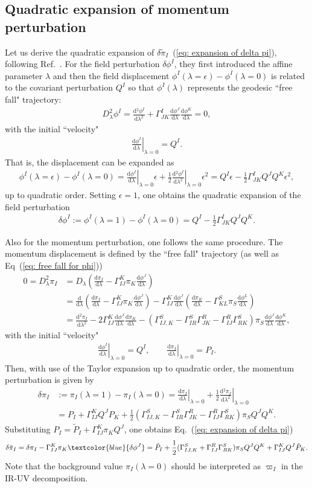 \documentclass[aps, prd
, preprint
, nofootinbib 
, longbibliography
]{revtex4-1}
\newcommand{\dif}[2]{\frac{\mathrm{d} #1}{\mathrm{d} #2}}
\newcommand{\bae}[1]{\begin{align} #1 \end{align}}
\newcommand{\mathblue}[1]{\textcolor{blue}{#1}}
\begin{document}
\subsection{Quadratic expansion of momentum perturbation}

Let us derive the quadratic expansion of $\delta\tilde{\pi}_I$~(\ref{eq: expansion of delta pi}), following Ref.~\cite{Gong:2011uw}.
For the field perturbation $\delta\phi^I$, they first introduced the affine parameter $\lambda$ and then the field displacement $\phi^I(\lambda=\epsilon)-\phi^I(\lambda=0)$ is related to the covariant perturbation $Q^I$ so that $\phi^I(\lambda)$ represents the geodesic ``free fall" trajectory:
\bae{\label{eq: free fall for phi}
    D_\lambda^2\phi^I=\dif{{}^2\phi^I}{\lambda^2}+\Gamma^I_{JK}\dif{\phi^J}{\lambda}\dif{\phi^K}{\lambda}=0,
}
with the initial ``velocity"
\bae{
    \left.\dif{\phi^I}{\lambda}\right|_{\lambda=0}=Q^I.
}
That is, the displacement can be expanded as
\bae{
    \phi^I(\lambda=\epsilon)-\phi^I(\lambda=0)=\left.\dif{\phi^I}{\lambda}\right|_{\lambda=0}\epsilon+\frac{1}{2}\left.\dif{{}^2\phi^I}{\lambda^2}\right|_{\lambda=0}\epsilon^2=Q^I\epsilon-\frac{1}{2}\Gamma^I_{JK}Q^JQ^K\epsilon^2,
}
up to quadratic order. Setting $\epsilon=1$, one obtains the quadratic expansion of the field perturbation
\bae{
    \delta\phi^I:=\phi^I(\lambda=1)-\phi^I(\lambda=0)=Q^I-\frac{1}{2}\Gamma^I_{JK}Q^JQ^K.
}

Also for the momentum perturbation, one follows the same procedure. The momentum displacement is defined by the ``free fall" trajectory (as well as Eq~(\ref{eq: free fall for phi}))
\bae{
    0=D_\lambda^2\pi_I&=D_\lambda\left(\dif{\pi_I}{\lambda}-\Gamma^K_{IJ}\pi_K\dif{\phi^J}{\lambda}\right) \nonumber \\
    &=\dif{}{\lambda}\left(\dif{\pi_I}{\lambda}-\Gamma^K_{IJ}\pi_K\dif{\phi^J}{\lambda}\right)-\Gamma^K_{IJ}\dif{\phi^J}{\lambda}\left(\dif{\pi_K}{\lambda}-\Gamma^S_{KL}\pi_S\dif{\phi^L}{\lambda}\right) \nonumber \\
    &=\dif{{}^2\pi_I}{\lambda^2}-2\Gamma^K_{IJ}\dif{\phi^J}{\lambda}\dif{\pi_K}{\lambda}-(\Gamma^S_{IJ,K}-\Gamma^S_{IR}\Gamma^R_{JK}-\Gamma^R_{IJ}\Gamma^S_{RK})\pi_S\dif{\phi^J}{\lambda}\dif{\phi^K}{\lambda},
}
with the initial ``velocity"
\bae{
    \left.\dif{\phi^I}{\lambda}\right|_{\lambda=0}=Q^I, \qquad \left.\dif{\pi_I}{\lambda}\right|_{\lambda=0}=P_I.
}
Then, with use of the Taylor expansion up to quadratic order, the momentum perturbation is given by
\bae{
    \delta\pi_I&:=\pi_I(\lambda=1)-\pi_I(\lambda=0)=\left.\dif{\pi_I}{\lambda}\right|_{\lambda=0}+\frac{1}{2}\left.\dif{{}^2\pi_I}{\lambda^2}\right|_{\lambda=0} \nonumber \\
    &=P_I+\Gamma^K_{IJ}Q^JP_K+\frac{1}{2}(\Gamma^S_{IJ,K}-\Gamma^S_{IR}\Gamma^R_{JK}-\Gamma^R_{IJ}\Gamma^S_{RK})\pi_SQ^JQ^K.
}
Substituting $P_I=\tilde{P}_I+\Gamma^K_{IJ}\pi_KQ^J$, one obtains Eq.~(\ref{eq: expansion of delta pi})
\bae{
    \delta\tilde{\pi}_I=\delta\pi_I-\Gamma^K_{IJ}\pi_K\mathblue{\delta\phi^J}=\tilde{P}_I+\frac{1}{2}(\Gamma^S_{IJ,K}+\Gamma^R_{IJ}\Gamma^S_{RK})\pi_SQ^JQ^K+\Gamma^K_{IJ}Q^J\tilde{P}_K.
}
Note that the background value $\pi_I(\lambda=0)$ should be interpreted as $\varpi_I$ in the IR-UV decomposition.
\end{document}
